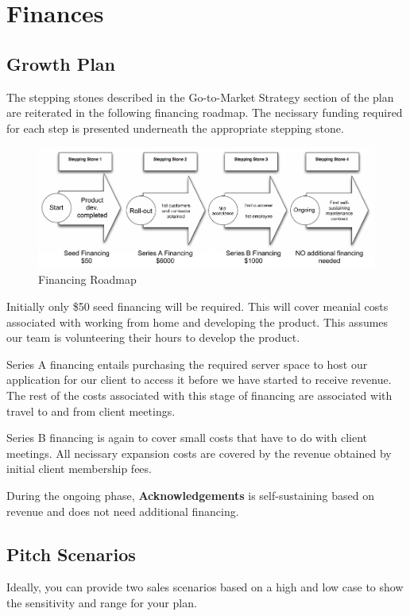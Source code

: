 \section{Finances}
\subsection{Growth Plan}
The stepping stones described in the Go-to-Market Strategy section of the plan are reiterated in the following financing roadmap. The necissary funding required for each step is presented underneath the appropriate stepping stone.

\begin{figure}[ht!]
\centering
\includegraphics[width=150mm]{images/MSCI454-FinancingRoadmap.png}
\caption{Financing Roadmap}
\label{steppingStones}
\end{figure}
 
Initially only \$50 seed financing will be required. This will cover meanial costs associated with working from home and developing the product. This assumes our team is volunteering their hours to develop the product.

Series A financing entails purchasing the required server space to host our application for our client to access it before we have started to receive revenue. The rest of the costs associated with this stage of financing are associated with travel to and from client meetings.

Series B financing is again to cover small costs that have to do with client meetings. All necissary expansion costs are covered by the revenue obtained by initial client membership fees.

During the ongoing phase, {\bf Acknowledgements} is self-sustaining based on revenue and does not need additional financing.

\subsection{Pitch Scenarios}
Ideally, you can provide two sales scenarios
based on a high and low case to show the sensitivity and range for your plan.

